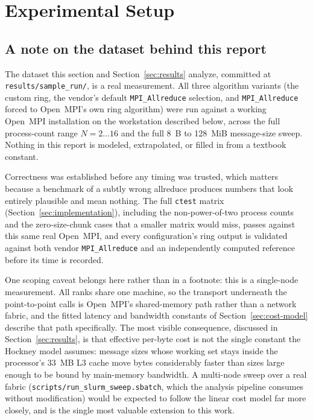\section{Experimental Setup}
\label{sec:experimental-setup}

\subsection{A note on the dataset behind this report}
\label{sec:dataset-note}

The dataset this section and Section~\ref{sec:results} analyze, committed at \texttt{results/sample\_run/}, is a real measurement. All three algorithm variants (the custom ring, the vendor's default \texttt{MPI\_Allreduce} selection, and \texttt{MPI\_Allreduce} forced to Open~MPI's own ring algorithm) were run against a working Open~MPI installation on the workstation described below, across the full process-count range $N = 2 \ldots 16$ and the full 8~B to 128~MiB message-size sweep. Nothing in this report is modeled, extrapolated, or filled in from a textbook constant.

Correctness was established before any timing was trusted, which matters because a benchmark of a subtly wrong allreduce produces numbers that look entirely plausible and mean nothing. The full \texttt{ctest} matrix (Section~\ref{sec:implementation}), including the non-power-of-two process counts and the zero-size-chunk cases that a smaller matrix would miss, passes against this same real Open~MPI, and every configuration's ring output is validated against both vendor \texttt{MPI\_Allreduce} and an independently computed reference before its time is recorded.

One scoping caveat belongs here rather than in a footnote: this is a single-node measurement. All ranks share one machine, so the transport underneath the point-to-point calls is Open~MPI's shared-memory path rather than a network fabric, and the fitted latency and bandwidth constants of Section~\ref{sec:cost-model} describe that path specifically. The most visible consequence, discussed in Section~\ref{sec:results}, is that effective per-byte cost is not the single constant the Hockney model assumes: message sizes whose working set stays inside the processor's 33~MB L3 cache move bytes considerably faster than sizes large enough to be bound by main-memory bandwidth. A multi-node sweep over a real fabric (\texttt{scripts/run\_slurm\_sweep.sbatch}, which the analysis pipeline consumes without modification) would be expected to follow the linear cost model far more closely, and is the single most valuable extension to this work.

